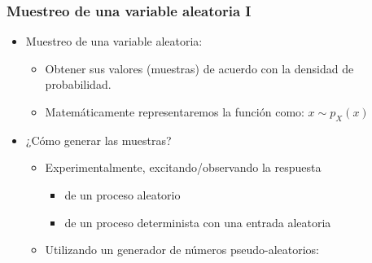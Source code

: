 \begin{frame}
\frametitle{Muestreo de una variable aleatoria I}

\footnotesize

\begin{itemize}
  \item \alert{Muestreo de una variable aleatoria:}
  \begin{itemize}\scriptsize
    \item Obtener sus valores (muestras) de acuerdo con la densidad de probabilidad.
    \item Matemáticamente representaremos la función como: \color{olivegreen}$x \sim p_X(x)$\color{black}
  \end{itemize}  
  \item \alert{¿Cómo generar las muestras?}
  \begin{itemize}\scriptsize
    \item  Experimentalmente, excitando/observando la respuesta 
    \begin{itemize}\scriptsize
      \item de un proceso aleatorio 
      \item de un proceso determinista con una entrada aleatoria
    \end{itemize}
    \item Utilizando un generador de números pseudo-aleatorios:


\end{itemize}
\end{itemize}
\end{frame}
